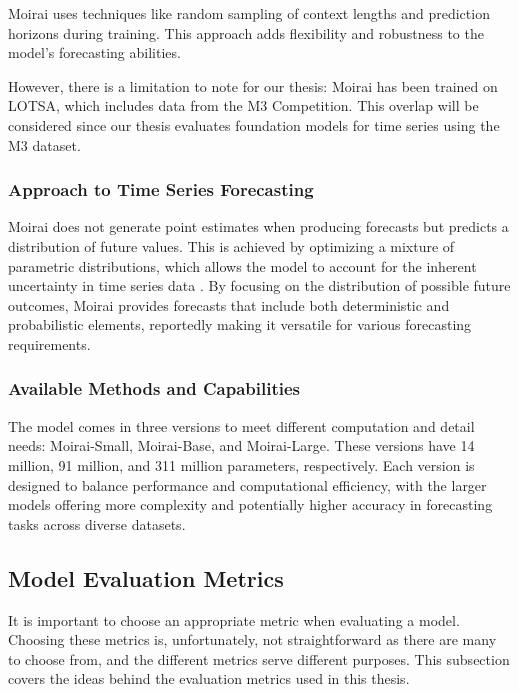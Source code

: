 \documentclass[12pt,a4paper]{article}
\begin{document}
Moirai uses techniques like random sampling of context lengths and prediction horizons during training. This approach adds flexibility and robustness to the model's forecasting abilities.

However, there is a limitation to note for our thesis: Moirai has been trained on LOTSA, which includes data from the M3 Competition. This overlap will be considered since our thesis evaluates foundation models for time series using the M3 dataset.

\subsubsection{Approach to Time Series Forecasting}

Moirai does not generate point estimates when producing forecasts but predicts a distribution of future values. This is achieved by optimizing a mixture of parametric distributions, which allows the model to account for the inherent uncertainty in time series data \cite{woo2024unified}. By focusing on the distribution of possible future outcomes, Moirai provides forecasts that include both deterministic and probabilistic elements, reportedly making it versatile for various forecasting requirements.

\subsubsection{Available Methods and Capabilities}

The model comes in three versions to meet different computation and detail needs: Moirai-Small, Moirai-Base, and Moirai-Large. These versions have 14 million, 91 million, and 311 million parameters, respectively. Each version is designed to balance performance and computational efficiency, with the larger models offering more complexity and potentially higher accuracy in forecasting tasks across diverse datasets.

\subsection{Model Evaluation Metrics} \label{modelevaluationmetrics}

It is important to choose an appropriate metric when evaluating a model. Choosing these metrics is, unfortunately, not straightforward as there are many to choose from, and the different metrics serve different purposes. This subsection covers the ideas behind the evaluation metrics used in this thesis. 
\end{document}
